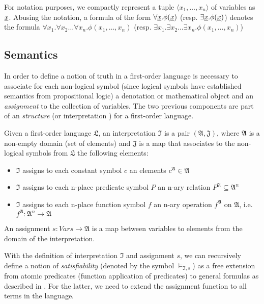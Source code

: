 \begin{definition}
For notation purposes, we compactly represent a tuple $\langle x_1, \dots, x_n \rangle$ of variables as
$\underline{x}$. Abusing the notation, a formula of the form 
$\forall \underline{x} . \phi(\underline{x})$ (resp. $\exists \underline{x} . \phi(\underline{x})$)
denotes the formula $\forall x_1 . \forall x_2 \dots \forall x_n . \phi(x_1, \dots, x_n)$
(resp. $\exists x_1 . \exists x_2 \dots \exists x_n . \phi(x_1, \dots, x_n)$)

\end{definition}

\subsection{Semantics}

In order to define a notion of truth in a first-order language is necessary to associate for each non-logical symbol (since logical symbols have established semantics from propositional logic) a denotation or mathematical object and an \emph{assignment} to the collection of variables. The two previous components are part of an \emph{structure} \cite{DBLP:books/daglib/0076838} (or interpretation \cite{DBLP:books/daglib/0080654}) for a first-order language.

\begin{definition}
  Given a first-order language $\mathfrak{L}$, an interpretation $\mathfrak{I}$ is a pair $(\mathfrak{A}, \mathfrak{J})$, where $\mathfrak{A}$ is a non-empty domain (set of elements) and $\mathfrak{J}$ is a map that associates to the non-logical symbols from $\mathfrak{L}$ the following elements:
  \begin{itemize}
    \item $\mathfrak{I}$ assigns to each constant symbol $c$
      an elements $c^\mathfrak{A} \in \mathfrak{A}$
    \item $\mathfrak{I}$ assigns to each n-place
      predicate symbol $P$ an n-ary relation 
      $P^{\mathfrak{A}} \subseteq \mathfrak{A}^n$
    \item $\mathfrak{I}$ assigns to each n-place function
      symbol $f$ an n-ary operation $f^\mathfrak{A}$
      on $\mathfrak{A}$, i.e. $f^\mathfrak{A} : 
      \mathfrak{A}^n \rightarrow \mathfrak{A}$
  \end{itemize}

  An assignment $s : Vars \rightarrow \mathfrak{A}$ is a 
  map between variables to elements from the domain of 
  the interpretation.
\end{definition}

With the definition of interpretation $\mathfrak{I}$ and assignment $s$, we can recursively define a notion of \emph{satisfiability} (denoted by the symbol $\models_{\mathfrak{I}, s} $) as a free extension from atomic predicates (function application of predicates) to general formulas as described in \cite{DBLP:books/daglib/0076838}. For the latter, we need to extend the assignment function to all terms in the language.

